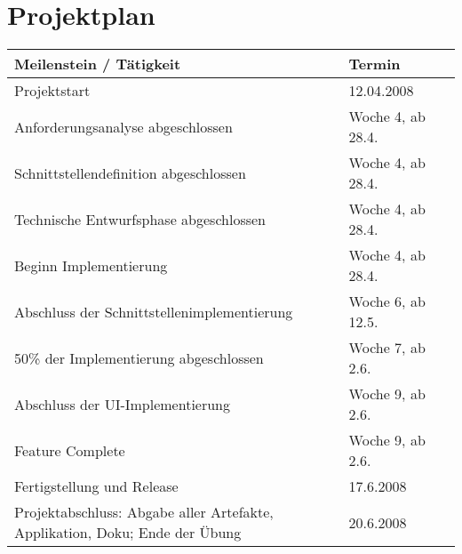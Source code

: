 

\section{Projektplan}
\begin{tabular}{ | p{11.2cm} | p{4cm} | l | }
\hline
\textbf{Meilenstein / Tätigkeit} & \textbf{Termin} \\
\hline
Projektstart & 12.04.2008\\
\hline
Anforderungsanalyse abgeschlossen & Woche 4, ab 28.4.\\
\hline
Schnittstellendefinition abgeschlossen  & Woche 4, ab 28.4.\\
\hline
Technische Entwurfsphase abgeschlossen & Woche 4, ab 28.4.\\
\hline
Beginn Implementierung & Woche 4, ab 28.4.\\
\hline
Abschluss der Schnittstellenimplementierung & Woche 6, ab 12.5.\\
\hline
50\% der Implementierung abgeschlossen & Woche 7, ab 2.6. \\
\hline 
Abschluss der UI-Implementierung & Woche 9, ab 2.6.\\
\hline
Feature Complete & Woche 9, ab 2.6.\\
\hline
Fertigstellung und Release & 17.6.2008 \\
\hline
Projektabschluss: Abgabe aller Artefakte, Applikation, Doku; Ende der Übung & 20.6.2008\\
\hline
\end{tabular}



